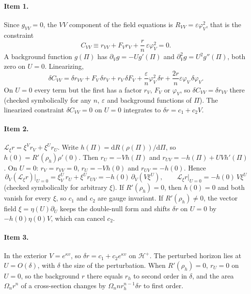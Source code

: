 \documentclass[11pt]{article}
\theoremstyle{plain}
\newcommand{\dd}{\mathrm{d}}
\newcommand{\eps}{\varepsilon}
\newcommand{\Hp}{\mathcal H^+}
\begin{document}
\paragraph{Item 1.} Since $g_{VV}=0$, the $VV$ component of the field equations is $R_{VV}=\eps\varphi_V^2$, that is the
constraint
\begin{equation}
C_{VV}\equiv r_{VV}+F_Vr_V+\frac r n\,\eps\varphi_V^2=0 .
\end{equation}
A background function $g(\Pi)$ has $\partial_Vg=-Ug'(\Pi)$ and $\partial_V^2g=U^2g''(\Pi)$, both zero on $U=0$. Linearizing,
\begin{equation}
\delta C_{VV}=\delta r_{VV}+F_V\,\delta r_V+r_V\,\delta F_V+\frac\eps n\varphi_V^2\,\delta r+\frac{2r}{n}\eps\varphi_V\,\delta\varphi_V .
\end{equation}
On $U=0$ every term but the first has a factor $r_V$, $F_V$ or $\varphi_V$, so $\delta C_{VV}=\delta r_{VV}$ there (checked
symbolically for any $n$, $\eps$ and background functions of $\Pi$). The linearized constraint $\delta C_{VV}=0$ on $U=0$
integrates to $\delta r=c_1+c_2V$.

\paragraph{Item 2.} $\mathcal L_\xi r=\xi^Vr_V+\xi^Ur_U$. Write $h(\Pi)=\dd R(\rho(\Pi))/\dd\Pi$, so $h(0)=R'(\rho_h)\rho'(0)$.
Then $r_U=-Vh(\Pi)$ and $r_{UV}=-h(\Pi)+UVh'(\Pi)$. On $U=0$: $r_V=r_{VV}=0$, $r_U=-Vh(0)$ and $r_{UV}=-h(0)$. Hence
\begin{equation}
\partial_V(\mathcal L_\xi r)\big|_{U=0}=\xi^U_V\,r_U+\xi^U r_{UV}=-h(0)\,\partial_V(V\xi^U),\qquad
\mathcal L_\xi r\big|_{U=0}=-h(0)\,V\xi^U
\end{equation}
(checked symbolically for arbitrary $\xi$). If $R'(\rho_h)=0$, then $h(0)=0$ and both vanish for every $\xi$, so $c_1$ and $c_2$
are gauge invariant. If $R'(\rho_h)\ne0$, the vector field $\xi=\eta(U)\partial_U$ keeps the double-null form and shifts
$\delta r$ on $U=0$ by $-h(0)\eta(0)V$, which can cancel $c_2$.

\paragraph{Item 3.} In the exterior $V=e^{\kappa v}$, so $\delta r=c_1+c_2e^{\kappa v}$ on $\Hp$. The perturbed horizon lies
at $U=O(\delta)$, with $\delta$ the size of the perturbation. When $R'(\rho_h)=0$, $r_U=0$ on $U=0$, so the background $r$
there equals $r_h$ to second order in $\delta$, and the area $\Omega_nr^n$ of a cross-section changes by
$\Omega_nnr_h^{n-1}\delta r$ to first order.
\end{document}
